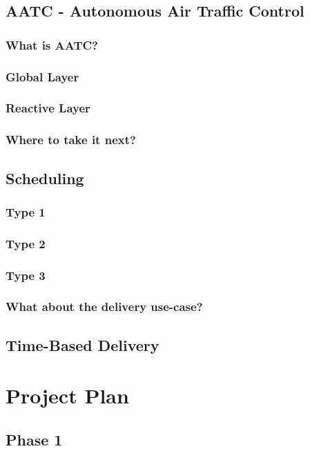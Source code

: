 \documentclass[12pt,titlepage]{article}
\begin{document}
\subsection{AATC - Autonomous Air Traffic Control}
\subsubsection{What is AATC?}
\subsubsection{Global Layer}
\subsubsection{Reactive Layer}
\subsubsection{Where to take it next?}

\subsection{Scheduling}
\subsubsection{Type 1}
\subsubsection{Type 2}
\subsubsection{Type 3}
\subsubsection{What about the delivery use-case?}

\subsection{Time-Based Delivery}

\newpage
\section{Project Plan}
\subsection{Phase 1}
\end{document}
